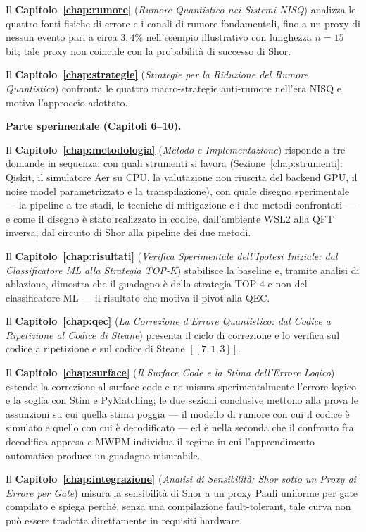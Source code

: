 \begin{onehalfspace}
Il \textbf{Capitolo~\ref{chap:rumore}} (\textit{Rumore Quantistico nei Sistemi NISQ}) analizza le quattro fonti fisiche di errore e i canali di rumore fondamentali, fino a un proxy di nessun evento pari a circa $3{,}4\%$ nell'esempio illustrativo con lunghezza $n=15$ bit; tale proxy non coincide con la probabilità di successo di Shor.

Il \textbf{Capitolo~\ref{chap:strategie}} (\textit{Strategie per la Riduzione del Rumore Quantistico}) confronta le quattro macro-strategie anti-rumore nell'era NISQ e motiva l'approccio adottato.

\medskip
\textbf{Parte sperimentale (Capitoli 6--10).}

Il \textbf{Capitolo~\ref{chap:metodologia}} (\textit{Metodo e Implementazione}) risponde a tre domande in sequenza: con quali strumenti si lavora (Sezione~\ref{chap:strumenti}: Qiskit, il simulatore Aer su CPU, la valutazione non riuscita del backend GPU, il noise model parametrizzato e la transpilazione), con quale disegno sperimentale --- la pipeline a tre stadi, le tecniche di mitigazione e i due metodi confrontati --- e come il disegno è stato realizzato in codice, dall'ambiente WSL2 alla QFT inversa, dal circuito di Shor alla pipeline dei due metodi.

Il \textbf{Capitolo~\ref{chap:risultati}} (\textit{Verifica Sperimentale dell'Ipotesi Iniziale: dal Classificatore ML alla Strategia TOP-K}) stabilisce la baseline e, tramite analisi di ablazione, dimostra che il guadagno è della strategia TOP-4 e non del classificatore \ac{ML} --- il risultato che motiva il pivot alla QEC.

Il \textbf{Capitolo~\ref{chap:qec}} (\textit{La Correzione d'Errore Quantistico: dal Codice a Ripetizione al Codice di Steane}) presenta il ciclo di correzione e lo verifica sul codice a ripetizione e sul codice di Steane $[[7,1,3]]$.

Il \textbf{Capitolo~\ref{chap:surface}} (\textit{Il Surface Code e la Stima dell'Errore Logico}) estende la correzione al surface code e ne misura sperimentalmente l'errore logico e la soglia con Stim e PyMatching; le due sezioni conclusive mettono alla prova le assunzioni su cui quella stima poggia --- il modello di rumore con cui il codice è simulato e quello con cui è decodificato --- ed è nella seconda che il confronto fra decodifica appresa e \ac{MWPM} individua il regime in cui l'apprendimento automatico produce un guadagno misurabile.

Il \textbf{Capitolo~\ref{chap:integrazione}} (\textit{Analisi di Sensibilità: Shor sotto un Proxy di Errore per Gate}) misura la sensibilità di Shor a un proxy Pauli uniforme per gate compilato e spiega perché, senza una compilazione fault-tolerant, tale curva non può essere tradotta direttamente in requisiti hardware.


\end{onehalfspace}

